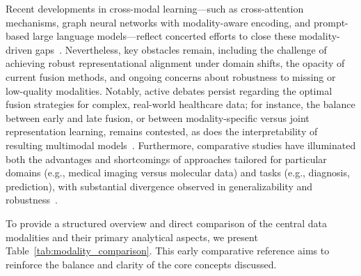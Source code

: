 \documentclass[sigconf]{acmart}
\begin{document}
Recent developments in cross-modal learning---such as cross-attention mechanisms, graph neural networks with modality-aware encoding, and prompt-based large language models---reflect concerted efforts to close these modality-driven gaps~\cite{ref16,ref17,ref18,ref67,ref68,ref70,ref107}. Nevertheless, key obstacles remain, including the challenge of achieving robust representational alignment under domain shifts, the opacity of current fusion methods, and ongoing concerns about robustness to missing or low-quality modalities. Notably, active debates persist regarding the optimal fusion strategies for complex, real-world healthcare data; for instance, the balance between early and late fusion, or between modality-specific versus joint representation learning, remains contested, as does the interpretability of resulting multimodal models~\cite{ref30,ref70}. Furthermore, comparative studies have illuminated both the advantages and shortcomings of approaches tailored for particular domains (e.g., medical imaging versus molecular data) and tasks (e.g., diagnosis, prediction), with substantial divergence observed in generalizability and robustness~\cite{ref54,ref67,ref83,ref90}. 

To provide a structured overview and direct comparison of the central data modalities and their primary analytical aspects, we present Table~\ref{tab:modality_comparison}. This early comparative reference aims to reinforce the balance and clarity of the core concepts discussed.
\end{document}
